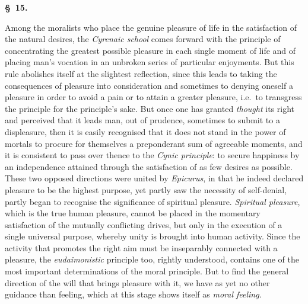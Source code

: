 \documentclass[12pt]{article}
\newcommand{\opage}[1]{\marginnote{\footnotesize\textit{[#1]}}}
\newcommand{\slaw}[1]{\par\medskip\begin{center}\textbf{\S~#1.}\end{center}\nopagebreak}
\begin{document}
\slaw{15}
Among the moralists who place the genuine pleasure of life in the satis\opage{148}faction of the natural desires, the \emph{Cyrenaic school} comes forward with the principle of concentrating the greatest possible pleasure in each single moment of life and of placing man's vocation in an unbroken series of particular enjoyments. But this rule abolishes itself at the slightest reflection, since this leads to taking the consequences of pleasure into consideration and sometimes to denying oneself a pleasure in order to avoid a pain or to attain a greater pleasure, i.e.\ to transgress the principle for the principle's sake. But once one has granted \emph{thought} its right and perceived that it leads man, out of prudence, sometimes to submit to a displeasure, then it is easily recognised that it does not stand in the power of mortals to procure for themselves a preponderant sum of agreeable moments, and it is consistent to pass over thence to the \emph{Cynic principle}: to secure happiness by an independence attained through the satisfaction of as few desires as possible. These two opposed directions were united by \emph{Epicurus}, in that he indeed declared pleasure to be the highest purpose, yet partly saw the necessity of self-denial, partly began to recognise the significance of spiritual pleasure. \emph{Spiritual pleasure}, which is the true human pleasure, cannot be placed in the momentary satisfaction of the mutually conflicting drives, but only in the execution of a single universal purpose, whereby unity is brought into human activity. Since the activity that promotes the right aim must be inseparably connected with a pleasure, the \emph{eudaimonistic} principle too, rightly understood, contains one of the most important determinations of the moral principle. But to find the general direction of the will that brings pleasure with it, we have as yet no other guidance than feeling, which at this stage shows itself as \emph{moral feeling}.
\end{document}
